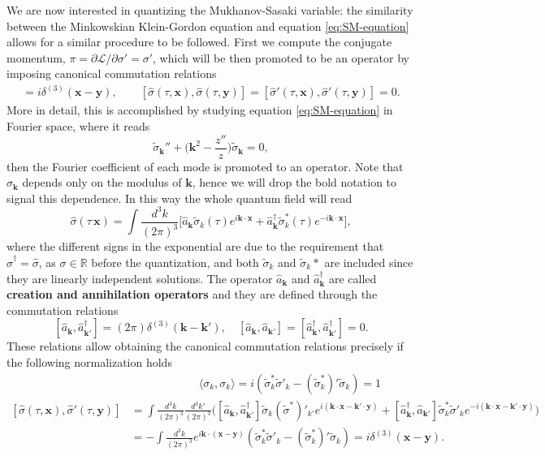 We are now interested in quantizing the Mukhanov-Sasaki variable: the similarity between the Minkowskian Klein-Gordon equation and equation \eqref{eq:SM-equation} allows for a similar procedure to be followed. First we compute the conjugate momentum, $\pi= \partial\mathcal{L} /\partial \sigma'=\sigma'$, which will be then promoted to be an operator by imposing canonical commutation relations
\begin{align*}
    [\hat\sigma(\tau,\mathbf x),\hat\sigma'(\tau,\mathbf y)]=i\delta^{(3)}(\mathbf{x-y}),\qquad  [\hat\sigma(\tau,\mathbf x),\hat\sigma(\tau,\mathbf y)]= [\hat\sigma'(\tau,\mathbf x),\hat\sigma'(\tau,\mathbf y)]=0.
\end{align*}
More in detail, this is accomplished by studying equation \eqref{eq:SM-equation} in Fourier space, where it reads
$$\tilde\sigma_\mathbf{k}''+\bigg(\mathbf k^2-\frac{z''}{z}\bigg)\tilde\sigma_\mathbf{k}=0,$$
then the Fourier coefficient of each mode is promoted to an operator. Note that $\sigma_\mathbf{k}$ depends only on the modulus of $\mathbf k$, hence we will drop the bold notation to signal this dependence. In this way the whole quantum field will read
$$\hat\sigma(\tau\,\mathbf{x})=\int\frac{d^3k}{(2\pi)^3}\bigg[\hat a_{\mathbf k}\tilde\sigma_k(\tau)e^{i\mathbf{k\cdot x}} +\hat a_{\mathbf k}^{\dagger}\tilde\sigma^*_k(\tau)e^{-i\mathbf{k\cdot x}}\bigg],$$
where the different signs in the exponential are due to the requirement that $\hat\sigma^\dagger=\hat\sigma$, as $\sigma\in\mathbb{R}$ before the quantization, and both $\tilde\sigma_k$ and $\tilde\sigma_k*$ are included since they are linearly independent solutions. The operator $\hat a_\mathbf{k}$ and $\hat a^\dagger_\mathbf{k}$ are called \textbf{creation and annihilation operators} and they are defined through the commutation relations $$[\hat a_\mathbf{k},\hat a^\dagger_\mathbf{k'}]=(2\pi)\delta^{(3)}(\mathbf{k-k'}),\quad [\hat a_\mathbf{k},\hat a_\mathbf{k'}]=[\hat a^\dagger_\mathbf{k},\hat a^\dagger_\mathbf{k'}]=0.$$ These relations allow obtaining the canonical commutation relations precisely if the following normalization holds
\begin{align*}
&\qquad\qquad\qquad\langle\sigma_k,\sigma_k\rangle=i(\tilde\sigma^*_k\tilde\sigma'_k-(\tilde\sigma_k^*)'\tilde\sigma_k)=1\\ [\hat\sigma(\tau,\mathbf x),\hat\sigma'(\tau,\mathbf y)]&=\int\frac{d^3k}{(2\pi)^3}\frac{d^3k'}{(2\pi)^3}    \Big([\hat a_\mathbf{k},\hat a^\dagger_\mathbf{k'}]\tilde\sigma_k(\tilde\sigma^*)'_{k'}e^{i(\mathbf{k\cdot x-k'\cdot y})}+[\hat a^\dagger_\mathbf{k},\hat a_\mathbf{k'}]\tilde\sigma_k^*\tilde\sigma'_ke^{-i(\mathbf{k\cdot x-k'\cdot y})}\Big)\\&=-\int\frac{d^3k}{(2\pi)^3}e^{i\mathbf{k\cdot(x-y)}}    (\tilde\sigma^*_k\tilde\sigma'_k-(\tilde\sigma_k^*)'\tilde\sigma_k)=i\delta^{(3)}(\mathbf{x-y}).
\end{align*}
